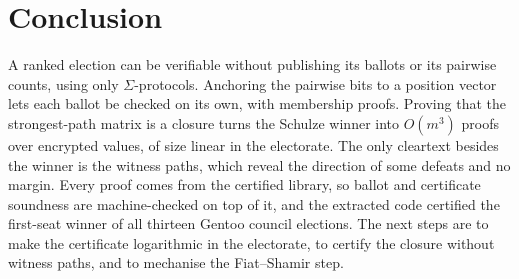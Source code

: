 \section{Conclusion}\label{sec:conclusion}
A ranked election can be verifiable without publishing its ballots or
its pairwise counts, using only $\Sigma$-protocols. Anchoring the
pairwise bits to a position vector lets each ballot be checked on its
own, with membership proofs. Proving that the
strongest-path matrix is a closure turns the Schulze winner into
$O(m^3)$ proofs over encrypted values, of size linear in the electorate.
The only cleartext besides the winner is the witness paths, which reveal
the direction of some defeats and no margin. Every proof comes from the certified library, so ballot
and certificate soundness are machine-checked on top of it, and the
extracted code certified the first-seat winner of all thirteen Gentoo
council elections. The next steps are to make the certificate
logarithmic in the electorate, to certify the closure without witness
paths, and to mechanise the Fiat--Shamir step.
